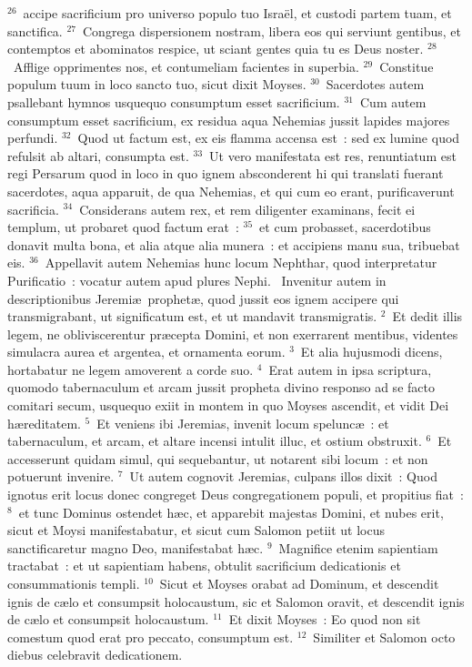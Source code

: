 ${}^{26}$~accipe sacrificium pro universo populo tuo Isra\"el, et custodi partem tuam, et sanctifica.
${}^{27}$~Congrega dispersionem nostram, libera eos qui serviunt gentibus, et contemptos et abominatos respice, ut sciant gentes quia tu es Deus noster.
${}^{28}$~Afflige opprimentes nos, et contumeliam facientes in superbia.
${}^{29}$~Constitue populum tuum in loco sancto tuo, sicut dixit Moyses.
${}^{30}$~Sacerdotes autem psallebant hymnos usquequo consumptum esset sacrificium.
${}^{31}$~Cum autem consumptum esset sacrificium, ex residua aqua Nehemias jussit lapides majores perfundi.
${}^{32}$~Quod ut factum est, ex eis flamma accensa est~: sed ex lumine quod refulsit ab altari, consumpta est.
${}^{33}$~Ut vero manifestata est res, renuntiatum est regi Persarum quod in loco in quo ignem absconderent hi qui translati fuerant sacerdotes, aqua apparuit, de qua Nehemias, et qui cum eo erant, purificaverunt sacrificia.
${}^{34}$~Considerans autem rex, et rem diligenter examinans, fecit ei templum, ut probaret quod factum erat~:
${}^{35}$~et cum probasset, sacerdotibus donavit multa bona, et alia atque alia munera~: et accipiens manu sua, tribuebat eis.
${}^{36}$~Appellavit autem Nehemias hunc locum Nephthar, quod interpretatur Purificatio~: vocatur autem apud plures Nephi.
~\lettrine[lines=10,image=true,loversize=0.05,lraise=-0.03]{I}{}nvenitur autem in descriptionibus Jeremi\ae\ prophet\ae , quod jussit eos ignem accipere qui transmigrabant, ut significatum est, et ut mandavit transmigratis.
${}^{2}$~Et dedit illis legem, ne obliviscerentur pr\ae cepta Domini, et non exerrarent mentibus, videntes simulacra aurea et argentea, et ornamenta eorum.
${}^{3}$~Et alia hujusmodi dicens, hortabatur ne legem amoverent a corde suo.
${}^{4}$~Erat autem in ipsa scriptura, quomodo tabernaculum et arcam jussit propheta divino responso ad se facto comitari secum, usquequo exiit in montem in quo Moyses ascendit, et vidit Dei h\ae reditatem.
${}^{5}$~Et veniens ibi Jeremias, invenit locum spelunc\ae~: et tabernaculum, et arcam, et altare incensi intulit illuc, et ostium obstruxit.
${}^{6}$~Et accesserunt quidam simul, qui sequebantur, ut notarent sibi locum~: et non potuerunt invenire.
${}^{7}$~Ut autem cognovit Jeremias, culpans illos dixit~: Quod ignotus erit locus donec congreget Deus congregationem populi, et propitius fiat~:
${}^{8}$~et tunc Dominus ostendet h\ae c, et apparebit majestas Domini, et nubes erit, sicut et Moysi manifestabatur, et sicut cum Salomon petiit ut locus sanctificaretur magno Deo, manifestabat h\ae c.
${}^{9}$~Magnifice etenim sapientiam tractabat~: et ut sapientiam habens, obtulit sacrificium dedicationis et consummationis templi.
${}^{10}$~Sicut et Moyses orabat ad Dominum, et descendit ignis de c\ae lo et consumpsit holocaustum, sic et Salomon oravit, et descendit ignis de c\ae lo et consumpsit holocaustum.
${}^{11}$~Et dixit Moyses~: Eo quod non sit comestum quod erat pro peccato, consumptum est.
${}^{12}$~Similiter et Salomon octo diebus celebravit dedicationem.


